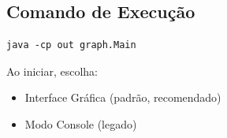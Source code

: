 \documentclass[12pt,a4paper]{article}
\begin{document}
    \subsection{Comando de Execução}

    \begin{verbatim}
java -cp out graph.Main
    \end{verbatim}

    Ao iniciar, escolha:
    \begin{itemize}
        \item [1] Interface Gráfica (padrão, recomendado)
        \item [2] Modo Console (legado)
    \end{itemize}
\end{document}
